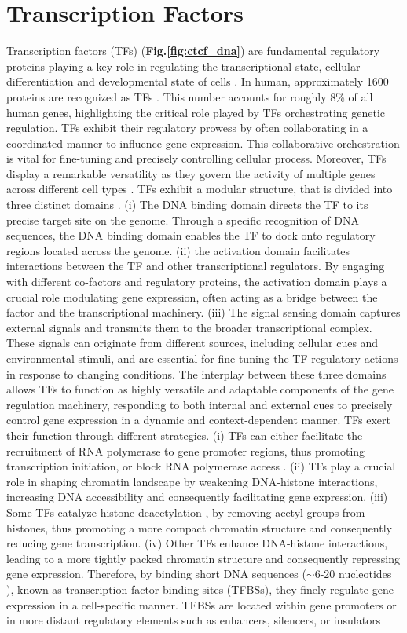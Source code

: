 \documentclass[a4paper, titlepage, openright]{book}
\newcommand{\mychapter}[2]{
    \setcounter{chapter}{#1}
    \setcounter{section}{0}
    \chapter*{#2}
    \addcontentsline{toc}{chapter}{#2}
}
\begin{document}
\mychapter{2}{Transcription Factors}
Transcription factors (TFs) (\textbf{Fig.\ref{fig:ctcf_dna}}) are fundamental regulatory proteins playing a key role in regulating the transcriptional state,  cellular differentiation and developmental state of cells  \citep{lambert2018human, reimold2001plasma, whyte2013master}.  In human, approximately 1600 proteins are recognized as TFs \citep{babu2004structure}.  This number accounts for roughly 8\% of all human genes, highlighting the critical role played by TFs orchestrating genetic regulation. TFs exhibit their regulatory prowess by often collaborating in a coordinated manner to influence gene expression. This collaborative orchestration is vital for fine-tuning and precisely controlling cellular process.  Moreover, TFs display a remarkable versatility as they govern the activity of multiple genes across different cell types \citep{lambert2018human}.  TFs exhibit a modular structure, that is divided into three distinct domains \citep{latchman1997transcription}.  (i) The DNA binding domain directs the TF to its precise target site on the genome.  Through a specific recognition of DNA sequences, the DNA binding domain enables the TF to dock onto regulatory regions located across the genome. (ii) the activation domain facilitates interactions between the TF and other transcriptional regulators. By engaging with different co-factors and regulatory proteins, the activation domain plays a crucial role modulating gene expression, often acting as a bridge between the factor and the transcriptional machinery.  (iii) The signal sensing domain captures external signals and transmits them to the broader transcriptional complex. These signals can originate from different sources, including cellular cues and environmental stimuli, and are essential for fine-tuning the TF regulatory actions in response to changing conditions.  The interplay between these three domains allows TFs to function as highly versatile and adaptable components of the gene regulation machinery, responding to both internal and external cues to precisely control gene expression in a dynamic and context-dependent manner. TFs exert their function through different strategies. (i) TFs can either facilitate the recruitment of RNA polymerase to gene promoter regions, thus promoting transcription initiation, or block RNA polymerase access \citep{fuda2009defining}. (ii) TFs play a crucial role in shaping chromatin landscape by weakening DNA-histone interactions,  increasing DNA accessibility and consequently facilitating gene expression. (iii) Some TFs catalyze histone deacetylation \citep{liu2016beyond}, by removing acetyl groups from histones, thus promoting a more compact chromatin structure and consequently reducing gene transcription. (iv) Other TFs enhance DNA-histone interactions, leading to a more tightly packed chromatin structure and consequently repressing gene expression. Therefore,  by binding short DNA sequences ($\sim$6-20 nucleotides  \citep{stewart2012transcription}), known as transcription factor binding sites (TFBSs), they finely regulate gene expression in a cell-specific manner.  TFBSs are located within gene promoters \citep{whitfield2012functional} or in more distant regulatory elements such as enhancers, silencers, or insulators 
\end{document}

